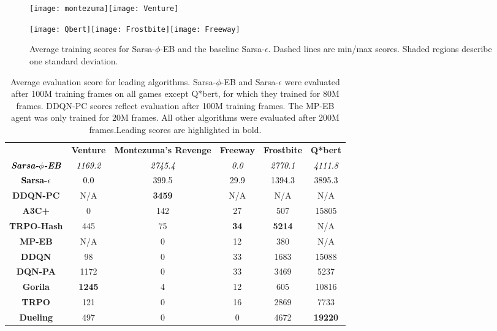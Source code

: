 \documentclass{article}
\providecommand{\tabularnewline}{\\}
\theoremstyle{definition}
\theoremstyle{definition}
\theoremstyle{plain}
\theoremstyle{plain}
\theoremstyle{plain}
\begin{document}
\begin{figure*}
\noindent \begin{centering}
\texttt{[image: montezuma]}\texttt{[image: Venture]}
\par\end{centering}

\noindent \begin{centering}
\texttt{[image: Qbert]}\texttt{[image: Frostbite]}\texttt{[image: Freeway]}
\par\end{centering}

\caption{Average training scores for Sarsa-$\phi$-EB and the baseline Sarsa-$\epsilon$.
Dashed lines are min/max scores. Shaded regions describe one standard
deviation.\label{fig:Average-training-scores}}
\end{figure*}
\begin{table*}[t]
\begin{centering}
\begin{tabular}{cccccc}
 & \textbf{Venture} & \textbf{Montezuma's Revenge} & \textbf{Freeway} & \textbf{Frostbite} & \textbf{Q{*}bert}\tabularnewline\addlinespace
\midrule
\midrule 
\textbf{\textit{\textcolor{black}{Sarsa-$\phi$-EB}}} & \textit{\textcolor{black}{1169.2}} & \textit{\textcolor{black}{2745.4}} & \textit{\textcolor{black}{0.0}} & \textit{\textcolor{black}{2770.1}} & \textit{\textcolor{black}{4111.8}}\tabularnewline
\midrule 
\textbf{\textcolor{black}{Sarsa-$\epsilon$}} & \textcolor{black}{0.0} & \textcolor{black}{399.5} & \textcolor{black}{29.9} & \textcolor{black}{1394.3} & \textcolor{black}{3895.3}\tabularnewline
\midrule
\midrule 
\textbf{DDQN-PC} & N/A & \textbf{3459} & N/A & N/A & N/A\tabularnewline
\midrule 
\textbf{A3C+} & 0 & 142 & 27 & 507 & 15805\tabularnewline
\midrule 
\textbf{TRPO-Hash} & 445 & 75 & \textbf{34} & \textbf{5214} & N/A\tabularnewline
\midrule 
\textbf{MP-EB} & N/A & 0 & 12 & 380 & N/A\tabularnewline
\midrule
\midrule 
\textbf{DDQN} & 98 & 0 & 33 & 1683 & 15088\tabularnewline
\midrule 
\textbf{DQN-PA} & 1172 & 0 & 33 & 3469 & 5237\tabularnewline
\midrule 
\textbf{Gorila} & \textbf{1245} & 4 & 12 & 605 & 10816\tabularnewline
\midrule 
\textbf{TRPO } & 121 & 0 & 16 & 2869 & 7733\tabularnewline
\midrule 
\textbf{Dueling} & 497 & 0 & 0 & 4672 & \textbf{19220}\tabularnewline
\bottomrule
\end{tabular}
\par\end{centering}

\caption{Average evaluation score for leading algorithms. Sarsa-$\phi$-EB
and Sarsa-$\epsilon$ were evaluated after 100M training frames on
all games except Q{*}bert, for which they trained for 80M frames.
DDQN-PC scores reflect evaluation after 100M training frames. The
MP-EB agent was only trained for 20M frames. All other algorithms
were evaluated after 200M frames.\label{table} Leading scores are
highlighted in bold.}
\end{table*}
\end{document}
